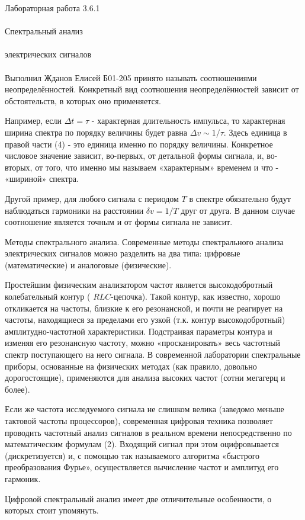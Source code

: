 \documentclass{astroedu-lab}
\begin{document}
\begin{problem}{\huge Лабораторная работа 3.6.1\\\\Спектральный анализ\\\\электрических сигналов\\\\Выполнил Жданов Елисей Б01-205}
принято называть соотношениями неопределённостей. Конкретный вид соотношения неопределённостей зависит от обстоятельств, в которых оно применяется.

Например, если $\Delta t=\tau$ - характерная длительность импульса, то характерная ширина спектра по порядку величины будет равна $\Delta v \sim 1 / \tau$. Здесь единица в правой части (4) - это единица именно по порядку величины. Конкретное числовое значение зависит, во-первых, от детальной формы сигнала, и, во-вторых, от того, что именно мы называем «характерным» временем и что - «шириной» спектра.

Другой пример, для любого сигнала с периодом $T$ в спектре обязательно будут наблюдаться гармоники на расстоянии $\delta v=1 / T$ друг от друга. В данном случае соотношение является точным и от формы сигнала не зависит.

Методы спектрального анализа. Современные методы спектрального анализа электрических сигналов можно разделить на два типа: цифровые (математические) и аналоговые (физические).

Простейшим физическим анализатором частот является высокодобротный колебательный контур ( $R L C$-цепочка). Такой контур, как известно, хорошо откликается на частоты, близкие к его резонансной, и почти не реагирует на частоты, находящиеся за пределами его узкой (т.к. контур высокодобротный) амплитудно-частотной характеристики. Подстраивая параметры контура и изменяя его резонансную частоту, можно «просканировать» весь частотный спектр поступающего на него сигнала. В современной лаборатории спектральные приборы, основанные на физических методах (как правило, довольно дорогостоящие), применяются для анализа высоких частот (сотни мегагерц и более).

Если же частота исследуемого сигнала не слишком велика (заведомо меньше тактовой частоты процессоров), современная цифровая техника позволяет проводить частотный анализ сигналов в реальном времени непосредственно по математическим формулам (2). Входящий сигнал при этом оцифровывается (дискретизуется) и, с помощью так называемого алгоритма «быстрого преобразования Фурье», осуществляется вычисление частот и амплитуд его гармоник.

Цифровой спектральный анализ имеет две отличительные особенности, о которых стоит упомянуть.


\end{problem}
\end{document}
